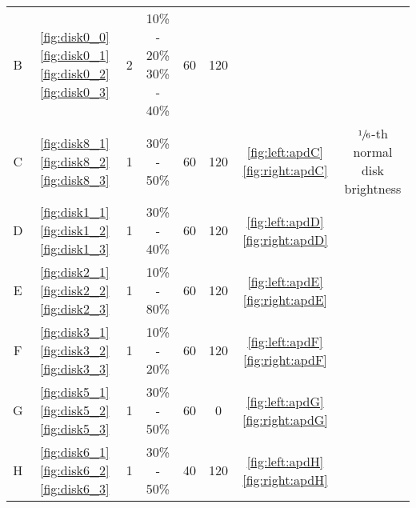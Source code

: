 \begin{table}
{\begin{tabular}{cccccccc}
    B         & \ref{fig:disk0_0} \ref{fig:disk0_1} \ref{fig:disk0_2} \ref{fig:disk0_3}  & 2 & \makecell[t]{10\% - 20\% \\ 
                                                                                           30\% - 40\%} & 60             & 120 \\
    C         & \ref{fig:disk8_1} \ref{fig:disk8_2} \ref{fig:disk8_3} & 1 & 30\% - 50\%                 & 60             & 120 & \autoref{fig:left:apdC} \autoref{fig:right:apdC} & \makecell[t]{$\sfrac{1}{6}$-th normal\\ disk brightness}\\ 
    D         & \ref{fig:disk1_1} \ref{fig:disk1_2} \ref{fig:disk1_3} & 1 & 30\% - 40\%                 & 60             & 120 & \autoref{fig:left:apdD} \autoref{fig:right:apdD}\\
    E         & \ref{fig:disk2_1} \ref{fig:disk2_2} \ref{fig:disk2_3} & 1 & 10\% - 80\%                 & 60             & 120 & \autoref{fig:left:apdE} \autoref{fig:right:apdE}\\
    F         & \ref{fig:disk3_1} \ref{fig:disk3_2} \ref{fig:disk3_3} & 1 & 10\% - 20\%                 & 60             & 120  & \autoref{fig:left:apdF} \autoref{fig:right:apdF}\\
    G         & \ref{fig:disk5_1} \ref{fig:disk5_2} \ref{fig:disk5_3} & 1 & 30\% - 50\%                 & 60             & 0   & \autoref{fig:left:apdG} \autoref{fig:right:apdG}\\
    H         & \ref{fig:disk6_1} \ref{fig:disk6_2} \ref{fig:disk6_3} & 1 & 30\% - 50\%                 & 40             & 120 & \autoref{fig:left:apdH} \autoref{fig:right:apdH}\\
    \bottomrule
    \end{tabular}
}
    \label{tab:disks}
\end{table}

